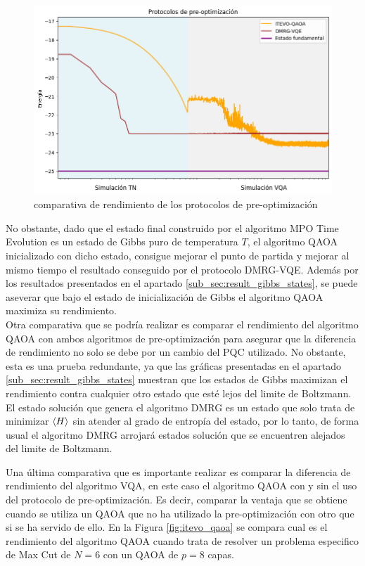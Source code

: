 \begin{figure}[!h]
    \centering
    \includegraphics[scale = 0.7]{plt/06-comparativa_protocolo.png}
    \caption{comparativa de rendimiento de los protocolos de pre-optimización}
    \label{fig:comparativa_protocolo}
\end{figure}


No obstante, dado que el estado final construido por el algoritmo MPO Time Evolution es un estado de Gibbs puro de temperatura $T$, el algoritmo QAOA inicializado con dicho estado, consigue mejorar el punto de partida y mejorar al mismo tiempo el resultado conseguido por el protocolo DMRG-VQE. Además por los resultados presentados en el apartado \ref{sub_sec:result_gibbs_states}, se puede aseverar que bajo el estado de inicialización de Gibbs el algoritmo QAOA maximiza su rendimiento. \\

Otra comparativa que se podría realizar es comparar el rendimiento del algoritmo QAOA con ambos algoritmos de pre-optimización para asegurar que la diferencia de rendimiento no solo se debe por un cambio del PQC utilizado. No obstante, esta es una prueba redundante, ya que las gráficas presentadas en el apartado \ref{sub_sec:result_gibbs_states} muestran que los estados de Gibbs maximizan el rendimiento contra cualquier otro estado que esté lejos del limite de Boltzmann. El estado solución que genera el algoritmo DMRG es un estado que solo trata de minimizar $\braket{H}$ sin atender al grado de entropía del estado, por lo tanto, de forma usual el algoritmo DMRG arrojará estados solución que se encuentren alejados del limite de Boltzmann.

\newpage

Una última comparativa que es importante realizar es comparar la diferencia de rendimiento del algoritmo VQA, en este caso el algoritmo QAOA con y sin el uso del protocolo de pre-optimización. Es decir, comparar la ventaja que se obtiene cuando se utiliza un QAOA que no ha utilizado la pre-optimización con otro que si se ha servido de ello. En la Figura \ref{fig:itevo_qaoa} se compara cual es el rendimiento del algoritmo QAOA cuando trata de resolver un problema especifico de Max Cut de $N=6$ con un QAOA de $p=8$ capas.


